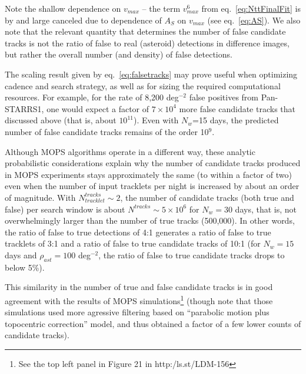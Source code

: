 Note the shallow dependence on $v_{max}$ -- the term $v_{max}^6$
from eq.~\ref{eq:NttFinalFit} is by and large canceled due to dependence of $A_S$ on
$v_{max}$ (see eq.~\ref{eq:AS}). We also note that the relevant quantity that determines
the number of false candidate tracks is not the ratio of false to real (asteroid) detections
in difference images, but rather the overall number (and density) of false detections.

The scaling result given by eq.~\ref{eq:falsetracks} may prove useful when optimizing cadence
and search strategy, as well as for sizing the required computational resources. For example,
for the rate of 8,200 deg$^{-2}$ false positives from Pan-STARRS1, one would expect a factor
of $7\times10^4$ more false candidate tracks that discussed above (that is, about $10^{11}$).
Even with $N_w$=15 days, the predicted number of false candidate tracks remains of the
order 10$^9$.

Although MOPS algorithms operate in a different way, these analytic probabilistic considerations
explain why the number of candidate tracks produced in MOPS experiments stays approximately
the same (to within a factor of two) even when the number of input tracklets per night is increased
by about an order of magnitude. With $N_{tracklet}^{tracks} \sim2$, the number of  candidate
tracks (both true and false) per search window is about $N^{tracks} \sim 5\times10^6$ for $N_w= 30$ days,
that is, not overwhelmingly larger than the number of true tracks (500,000). In other words, the ratio of
false to true detections of 4:1 generates a ratio of false to true tracklets of 3:1 and a ratio of false to true
candidate tracks of 10:1 (for $N_w=15$ days and $\rho_{ast}=100$ deg$^{-2}$, the ratio of false to true
candidate tracks drops to below 5\%).

This similarity in the number of true and false candidate tracks is in good
agreement with the results of MOPS simulations\footnote{See the top left panel
in Figure 21 in http:/ls.st/LDM-156} (though note that those simulations used more agressive filtering
based on ``parabolic motion plus topocentric correction'' model, and thus obtained a factor of a few
lower counts of candidate tracks).
